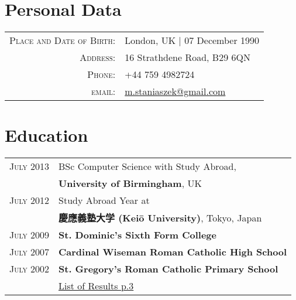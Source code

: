 \documentclass[a4paper,10pt]{article}
\begin{document}
\par{\bigskip\par}

\section{Personal Data}

\begin{tabular}{rl}
  \textsc{Place and Date of Birth:} & London, UK  | 07 December 1990 \\
  \textsc{Address:}   & 16 Strathdene Road, B29 6QN \\
  \textsc{Phone:}     & +44 759 4982724\\
  \textsc{email:}     & \href{mailto:m.staniaszek@gmail.com}{m.staniaszek@gmail.com}
\end{tabular}

\section{Education}
\begin{tabular}{rp{9cm}}
  \textsc{July} 2013 & BSc Computer Science with Study Abroad,\\& \textbf{University of Birmingham}, UK\\
  \textsc{July} 2012 & Study Abroad Year at\\& \textbf{慶應義塾大学 (Keiō University)}, Tokyo, Japan\\
  \textsc{July} 2009& \textbf{St. Dominic's Sixth Form College}\\
  \textsc{July} 2007& \textbf{Cardinal Wiseman Roman Catholic High School}\\
  \textsc{July} 2002& \textbf{St. Gregory's Roman Catholic Primary School}\\&
  \hyperlink{bham_ug}{\hfill \footnotesize List of Results p.3}
\end{tabular}
\end{document}
